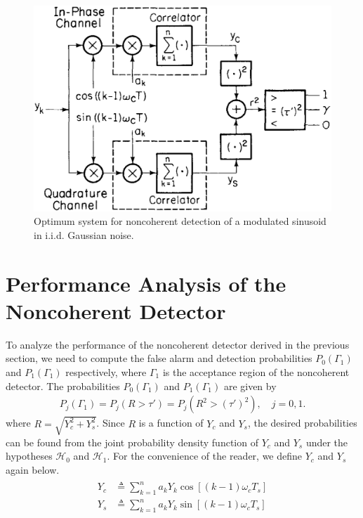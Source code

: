 \documentclass[12pt]{report}
\begin{document}
	\begin{figure}%
		\centering
		\includegraphics[scale=0.3]{Figures/Noncoherent_Detector.eps}
		\caption{Optimum system for noncoherent detection of a modulated sinusoid in i.i.d. Gaussian noise.}
		\label{fig:nonCohDetector}
	\end{figure}

	\section{Performance Analysis of the Noncoherent Detector}
	To analyze the performance of the noncoherent detector derived in the previous section, we need to compute the false alarm and detection probabilities $P_0(\Gamma_1)$ 
	and $P_1(\Gamma_1)$ respectively, where $\Gamma_1$ is the acceptance region of the noncoherent detector. The probabilities $P_0(\Gamma_1)$ and $P_1(\Gamma_1)$ are given by
	\begin{align}
	 P_j\left(\Gamma_1\right) = P_j\left(R > \tau'\right) = P_j\left(R^2 > \left(\tau'\right)^2\right),\quad j = 0, 1.
	\end{align}
	where $R = \sqrt{Y_c^2 + Y_s^2}$. Since $R$ is a function of $Y_c$ and $Y_s$, the desired probabilities can be found from the joint probability density function of 
	$Y_c$ and $Y_s$ under the hypotheses $\mathcal{H}_0$ and $\mathcal{H}_1$. For the convenience of the reader, we define $Y_c$ and $Y_s$ again below.
	\begin{align}
	\begin{aligned}
	 Y_c &\triangleq \sum_{k=1}^n a_k Y_k \cos\left[\left(k-1\right) \omega_c T_s\right]\\
	 Y_s &\triangleq \sum_{k=1}^n a_k Y_k \sin\left[\left(k-1\right) \omega_c T_s\right]
	 \end{aligned}
	\end{align}
\end{document}

